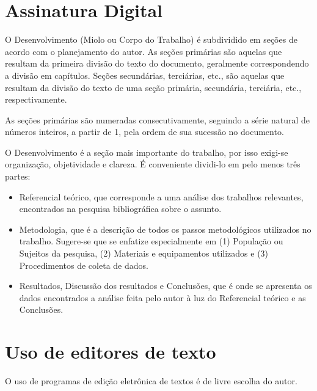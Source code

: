 \section{Assinatura Digital}

O Desenvolvimento (Miolo ou Corpo do Trabalho) é subdividido em seções de 
acordo com o planejamento do autor. As seções primárias são aquelas que 
resultam da primeira divisão do texto do documento, geralmente 
correspondendo a divisão em capítulos. Seções secundárias, terciárias, 
etc., são aquelas que resultam da divisão do texto de uma seção primária, 
secundária, terciária, etc., respectivamente.

As seções primárias são numeradas consecutivamente, seguindo a série 
natural de números inteiros, a partir de 1, pela ordem de sua sucessão no 
documento.

O Desenvolvimento é a seção mais importante do trabalho, por isso exigi-se 
organização, objetividade e clareza. É conveniente dividi-lo em pelo menos 
três partes:

\begin{itemize}

	\item Referencial teórico, que corresponde a uma análise dos trabalhos 
	relevantes, encontrados na pesquisa bibliográfica sobre o assunto. 
	\item Metodologia, que é a descrição de todos os passos metodológicos 
	utilizados no trabalho. Sugere-se que se enfatize especialmente em (1) 
	População ou Sujeitos da pesquisa, (2) Materiais e equipamentos 
	utilizados e (3) Procedimentos de coleta de dados.
	\item Resultados, Discussão dos resultados e Conclusões, que é onde se 
	apresenta os dados encontrados a análise feita pelo autor à luz do 
	Referencial teórico e as Conclusões.

\end{itemize}

\section{Uso de editores de texto}

O uso de programas de edição eletrônica de textos é de livre escolha do autor. 

